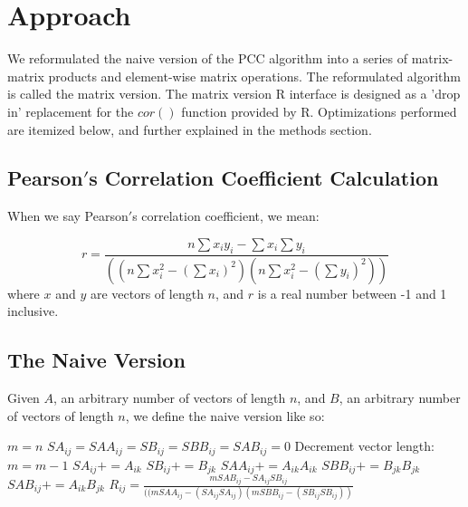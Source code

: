 \documentclass{bioinfo}
\begin{document}
\section{Approach}
We reformulated the naive version of the PCC algorithm into a series of 
matrix-matrix products and element-wise matrix operations. The 
reformulated algorithm is called the matrix version. The matrix version 
R interface is designed as a 'drop in' replacement for the $cor()$ 
function provided by R. Optimizations performed are itemized below, and further 
explained in the methods section.

\subsection{Pearson$'$s Correlation Coefficient Calculation}
When we say Pearson$'$s correlation coefficient, we mean:

\begin{equation}
r=\frac{n\sum x_iy_i-\sum x_i\sum y_i}{((n\sum x_i^2-(\sum x_i)^2)(n\sum x_i^2-(\sum y_i)^2))}
\end{equation}
where $x$ and $y$ are vectors of length $n$, and $r$ is a real number between -1 and 1 inclusive.

\subsection{The Naive Version}

Given $A$, an arbitrary number of vectors of length $n$, and $B$, an arbitrary number of vectors of length $n$, 
we define the naive version like so:

\vspace{2mm}

\begin{algorithmic}[0]
    \STATE $m=n$
    \STATE $SA_{ij}=SAA_{ij}=SB_{ij}=SBB_{ij}=SAB_{ij}=0$
        \STATE Decrement vector length: $m=m-1$
      \ELSE
        \STATE $SA_{ij}+=A_{ik}$
        \STATE $SB_{ij}+=B_{jk}$
        \STATE $SAA_{ij}+=A_{ik}A_{ik}$
        \STATE $SBB_{ij}+=B_{jk}B_{jk}$
        \STATE $SAB_{ij}+=A_{ik}B_{jk}$
      \ENDIF
    \ENDFOR 
    \STATE $R_{ij}=\frac{mSAB_{ij}-SA_{ij}SB_{ij}}{((mSAA_{ij}-(SA_{ij}SA_{ij})(mSBB_{ij}-(SB_{ij}SB_{ij}))}$
  \ENDFOR
\ENDFOR
\end{algorithmic}
\end{document}
